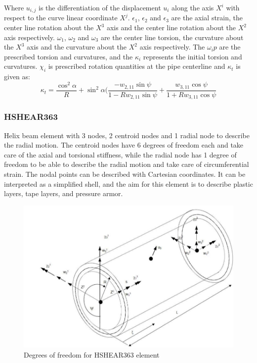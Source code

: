 \noindent Where $u_{i,j}$ is the differentiation of the displacement $u_i$ along the axis $X^i$ with respect to the curve linear coordinate $X^j$. $\epsilon_1$, $\epsilon_2$ and $\epsilon_3$ are the axial strain, the center line rotation about the $X^3$ axis and the center line rotation about the $X^2$ axis respectively. $\omega_1$, $\omega_2$ and $\omega_3$ are the center line torsion, the curvature about the $X^3$ axis and the curvature about the $X^2$ axis respectively. The $\omega_ip$ are the prescribed torsion and curvatures, and the $\kappa_i$ represents the initial torsion and curvatures. $\chi_i$ is prescribed rotation quantities at the pipe centerline and $\kappa_t$ is given as:
\begin{equation}
    \kappa_t=\frac{\cos^2\alpha}{R}+\sin^2 \alpha (\frac{-w_{2,11}\sin \psi }{1-R w_{2,11} \sin \psi} + \frac{w_{3,11}\cos \psi }{1+R w_{3,11} \cos \psi}
\end{equation}

\subsubsection{HSHEAR363}
Helix beam element with 3 nodes, 2 centroid nodes and 1 radial node to describe the radial motion. The centroid nodes have 6 degrees of freedom each and take care of the axial and torsional stiffness, while the radial node has 1 degree of freedom to be able to describe the radial motion and take care of circumferential strain.  The nodal points can be described with Cartesian coordinates. It can be interpreted as a simplified shell, and the aim for this element is to describe plastic layers, tape layers, and pressure armor. 

\begin{figure}[H]
\centering
\includegraphics[scale=0.5]{figures/hshear363}
\caption[$\; \:$HSHEAR363]{Degrees of freedom for HSHEAR363 element \cite{Bflextheory2013} }
 \label{fig:363}
\end{figure}


